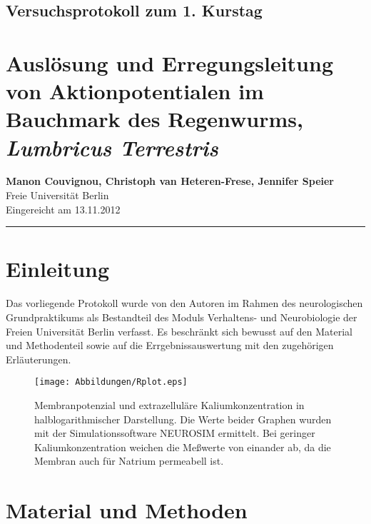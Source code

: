 \documentclass[11pt,a4paper,DIV=10,]{scrartcl}
\begin{document}
\onecolumn
\subsection*{Versuchsprotokoll zum 1. Kurstag }
\section*{Auslösung und Erregungsleitung von Aktionpotentialen im Bauchmark des Regenwurms, \textit{Lumbricus Terrestris}}
\textbf{ Manon Couvignou\footnotemark[1], Christoph van Heteren-Frese\footnotemark[1], Jennifer Speier\footnotemark[1]} \\[0.1cm]
\footnotemark[1]Freie Universität Berlin\\[0.2cm]
Eingereicht am 13.11.2012\\
\hrule

\section*{Einleitung}    
Das vorliegende Protokoll wurde von den Autoren im Rahmen des neurologischen Grundpraktikums als Bestandteil des Moduls Verhaltens- und Neurobiologie der Freien Universität Berlin verfasst. Es beschränkt sich bewusst auf den Material und Methodenteil sowie auf die Errgebnissauswertung  mit den zugehörigen Erläuterungen.

\begin{figure}[H]
\center
\captionsetup{width=1\textwidth}	
\texttt{[image: Abbildungen/Rplot.eps]}
\caption{Membranpotenzial und extrazelluläre Kaliumkonzentration in halblogarithmischer Darstellung. Die Werte beider Graphen wurden mit der Simulationssoftware NEUROSIM ermittelt. Bei geringer Kaliumkonzentration weichen die Meßwerte von einander ab, da die Membran auch für Natrium permeabell ist.}
\label{v1}
\end{figure}

\section*{Material und Methoden}
%
\end{document}
